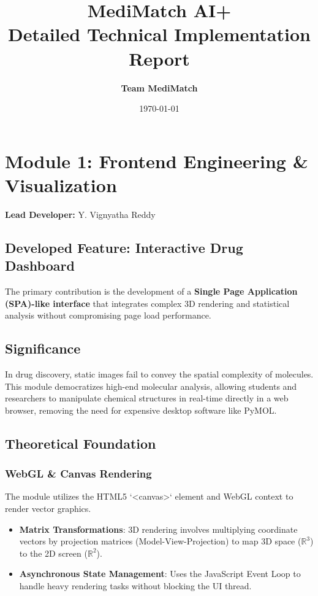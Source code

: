 \documentclass[a4paper,12pt]{report}
\title{\textbf{\Huge MediMatch AI+ \\ \LARGE Detailed Technical Implementation Report}}
\author{\textbf{Team MediMatch}}
\date{\today}
\begin{document}
\maketitle
\tableofcontents
\newpage

\chapter{Module 1: Frontend Engineering \& Visualization}
\textbf{Lead Developer:} Y. Vignyatha Reddy

\section{Developed Feature: Interactive Drug Dashboard}
The primary contribution is the development of a \textbf{Single Page Application (SPA)-like interface} that integrates complex 3D rendering and statistical analysis without compromising page load performance.

\section{Significance}
In drug discovery, static images fail to convey the spatial complexity of molecules. This module democratizes high-end molecular analysis, allowing students and researchers to manipulate chemical structures in real-time directly in a web browser, removing the need for expensive desktop software like PyMOL.

\section{Theoretical Foundation}
\subsection{WebGL & Canvas Rendering}
The module utilizes the HTML5 `<canvas>` element and WebGL context to render vector graphics.
\begin{itemize}
    \item \textbf{Matrix Transformations}: 3D rendering involves multiplying coordinate vectors by projection matrices (Model-View-Projection) to map 3D space ($\mathbb{R}^3$) to the 2D screen ($\mathbb{R}^2$).
    \item \textbf{Asynchronous State Management}: Uses the JavaScript Event Loop to handle heavy rendering tasks without blocking the UI thread.
\end{itemize}
\end{document}
